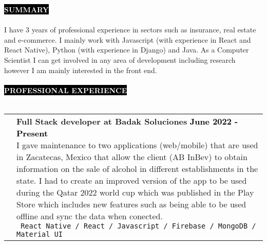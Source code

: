 \documentclass[11pt,A4]{article}
\makeatletter
\newcounter{a}
\newcounter{b}
\newcounter{c}
\newcommand{\cvsection}[1] {
  \textcolor{white}{\MakeUppercase{\textbf{#1}}}
}
\newcommand{\cvsect}[1]{
  \colorbox{black}{{\cvsection{#1}}}\\ \\%
}
\newenvironment{entrylist}{%
  \begin{tabular*}{\textwidth}[t]{@{\extracolsep{\fill}}ll}
  }{%
  \end{tabular*}
}
\newcommand{\entry}[5]{%
  &\parbox[t]{17.5cm}{%
    \large\textbf{#1}%
    \hfill
    {\small \textbf{\textcolor{black}{#2}}}\\%
    \normalsize #4\\
    \texttt{#5}
  }\\\\}
\newcommand{\slashsep}{
  \hspace{1mm}/\hspace{1mm}
}
\makeatother
\begin{document}
\cvsect{Summary} 
  I have 3 years of professional experience in sectors such as insurance, real estate and e-commerce. I mainly work with Javascript (with experience in React and React Native), Python (with experience in Django) and Java. As a Computer Scientist I can get involved in any area of development including research however I am mainly interested in the front end. \\
  \\
  \cvsect{Professional Experience}
  \begin{entrylist}
    \entry
    {Full Stack developer at Badak Soluciones}
    {June 2022 - Present}
    {AB InBev}
    {I gave maintenance to two applications (web/mobile) that are used in Zacatecas, Mexico that allow the client (AB InBev) to obtain information on the sale of alcohol in different establishments in the state. I had to create an improved version of the app to be used during the Qatar 2022 world cup which was published in the Play Store which includes new features such as being able to be used offline and sync the data when conected.}
    { React Native \slashsep React \slashsep Javascript \slashsep Firebase \slashsep MongoDB \slashsep Material UI}
    \entry
    {Front end developer at GNP Seguros}
    {April 2021 - February 2022}
    {GNP Seguros}
    {UI for an insurance company where agents can fill all data required for several types of insurances based on their client's needs to get the cost and try to make an offer.}
    { React \slashsep Javascript \slashsep Redux \slashsep Material UI \slashsep Team Management}
    \entry
    {Full stack developer at M22}
    {October 2020 - February 2021}
    {M22}
    {UI for a real estate company where people can view details and availability of several places for make purchase agreement. All the data updates in real time and the content is modified from a Content Management System(CMS).}
    {React \slashsep Javascript \slashsep Strapi JS \slashsep QGIS \slashsep GraphQL \slashsep PostgreSQL}
    \entry
    {Full stack developer at Ultra maratón sierra mixe}
    {January 2020 - September 2020}
    {Ultra maratón sierra mixe}
    {This is a client's project on the automation of the processes involved in the realization of a marathon race such as registration, marketing and payment.}
    { React \slashsep Javascript \slashsep Google Firebase \slashsep Bootstrap}
  \end{entrylist}
\end{document}
